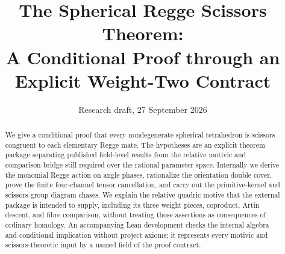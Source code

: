 \documentclass[11pt,reqno]{amsart}
\title[The spherical Regge theorem]
  {The Spherical Regge Scissors Theorem:\\
   A Conditional Proof through an Explicit Weight-Two Contract}
\author{}
\date{Research draft, 27 September 2026}
\begin{document}
\begin{abstract}
We give a conditional proof that every nondegenerate spherical tetrahedron
is scissors congruent to each elementary Regge mate.  The hypotheses are an
explicit theorem package separating published field-level results from the
relative motivic and comparison bridge still required over the rational
parameter space.  Internally we derive the monomial Regge action on angle
phases, rationalize the orientation double cover, prove the finite
four-channel tensor cancellation, and carry out the primitive-kernel and
scissors-group diagram chases.  We explain the relative quadric motive that
the external package is intended to supply, including its three weight
pieces, coproduct, Artin descent, and fibre comparison, without treating
those assertions as consequences of ordinary homology.  An accompanying
Lean development checks the internal algebra and conditional implication
without project axioms; it represents every motivic and scissors-theoretic
input by a named field of the proof contract.
\end{abstract}

\maketitle
\tableofcontents









\end{document}
